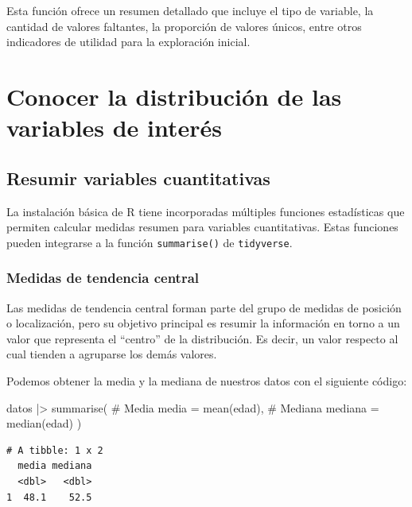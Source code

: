 \documentclass[
  spanish,
  a4paper,
]{scrbook}
\newenvironment{Shaded}{\begin{snugshade}}{\end{snugshade}}
\newcommand{\AttributeTok}[1]{\textcolor[rgb]{0.40,0.45,0.13}{#1}}
\newcommand{\CommentTok}[1]{\textcolor[rgb]{0.37,0.37,0.37}{#1}}
\newcommand{\FunctionTok}[1]{\textcolor[rgb]{0.28,0.35,0.67}{#1}}
\newcommand{\NormalTok}[1]{\textcolor[rgb]{0.00,0.23,0.31}{#1}}
\newcommand{\SpecialCharTok}[1]{\textcolor[rgb]{0.37,0.37,0.37}{#1}}
\begin{document}
Esta función ofrece un resumen detallado que incluye el tipo de
variable, la cantidad de valores faltantes, la proporción de valores
únicos, entre otros indicadores de utilidad para la exploración inicial.

\section{Conocer la distribución de las variables de
interés}\label{conocer-la-distribuciuxf3n-de-las-variables-de-interuxe9s}

\subsection{Resumir variables
cuantitativas}\label{resumir-variables-cuantitativas}

La instalación básica de R tiene incorporadas múltiples funciones
estadísticas que permiten calcular medidas resumen para variables
cuantitativas. Estas funciones pueden integrarse a la función
\texttt{summarise()} de \texttt{tidyverse}.

\subsubsection{Medidas de tendencia
central}\label{medidas-de-tendencia-central}

Las medidas de tendencia central forman parte del grupo de medidas de
posición o localización, pero su objetivo principal es resumir la
información en torno a un valor que representa el ``centro'' de la
distribución. Es decir, un valor respecto al cual tienden a agruparse
los demás valores.

Podemos obtener la media y la mediana de nuestros datos con el siguiente
código:

\begin{Shaded}
\begin{Highlighting}[]
\NormalTok{datos }\SpecialCharTok{|\textgreater{}}
  \FunctionTok{summarise}\NormalTok{(}
    \CommentTok{\# Media}
    \AttributeTok{media =} \FunctionTok{mean}\NormalTok{(edad),}
    \CommentTok{\# Mediana}
    \AttributeTok{mediana =} \FunctionTok{median}\NormalTok{(edad)}
\NormalTok{  )}
\end{Highlighting}
\end{Shaded}

\begin{verbatim}
# A tibble: 1 x 2
  media mediana
  <dbl>   <dbl>
1  48.1    52.5
\end{verbatim}
\end{document}
